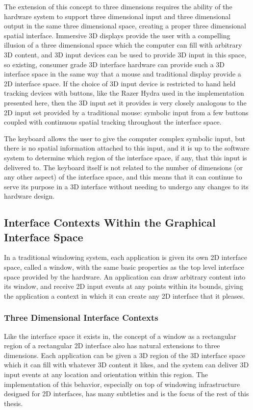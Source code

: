 The extension of this concept to three dimensions requires the ability of the hardware system to support three dimensional input and three dimensional output in the same three dimensional space, creating a proper three dimensional spatial interface. Immersive 3D displays provide the user with a compelling illusion of a three dimensional space which the computer can fill with arbitrary 3D content, and 3D input devices can be used to provide 3D input in this space, so existing, consumer grade 3D interface hardware can provide such a 3D interface space in the same way that a mouse and traditional display provide a 2D interface space. If the choice of 3D input device is restricted to hand held tracking devices with buttons, like the Razer Hydra used in the implementation presented here, then the 3D input set it provides is very closely analogous to the 2D input set provided by a traditional mouse: symbolic input from a few buttons coupled with continuous spatial tracking throughout the interface space.

The keyboard allows the user to give the computer complex symbolic input, but there is no spatial information attached to this input, and it is up to the software system to determine which region of the interface space, if any, that this input is delivered to. The keyboard itself is not related to the number of dimensions (or any other aspect) of the interface space, and this means that it can continue to serve its purpose in a 3D interface without needing to undergo any changes to its hardware design.

\subsection{Interface Contexts Within the Graphical Interface Space}
In a traditional windowing system, each application is given its own 2D interface space, called a window, with the same basic properties as the top level interface space provided by the hardware. An application can draw arbitrary content into its window, and receive 2D input events at any points within its bounds, giving the application a context in which it can create any 2D interface that it pleases. 

\subsubsection{Three Dimensional Interface Contexts}

Like the interface space it exists in, the concept of a window as a rectangular region of a rectangular 2D interface also has natural extensions to three dimensions. Each application can  be given a 3D region of the 3D interface space which it can fill with whatever 3D content it likes, and the system can deliver 3D input events at any location and orientation within this region. The implementation of this behavior, especially on top of windowing infrastructure designed for 2D interfaces, has many subtleties and is the focus of the rest of this thesis.

